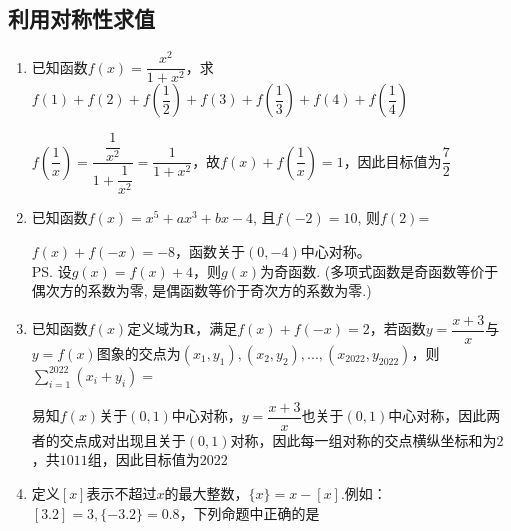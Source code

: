\subsection*{利用对称性求值}
\begin{enumerate}
    \item 已知函数$f(x) = \dfrac{x^2}{1+x^2}$，求$f(1)+f(2)+f\left(\dfrac{1}{2}\right) + f(3) + f\left(\dfrac{1}{3}\right) + f(4) + f\left(\dfrac{1}{4}\right)$
    \begin{jieda}
        $f\left(\dfrac{1}{x}\right) = \dfrac{\dfrac{1}{x^2}}{1+\dfrac{1}{x^2}} = \dfrac{1}{1+x^2}$，故$f(x) + f\left(\dfrac{1}{x}\right) = 1$，因此目标值为$\dfrac{7}{2}$
    \end{jieda}
    \item 已知函数$f(x)=x^5+ax^3+bx-4$, 且$f(-2)=10$, 则$f(2)$=
    \begin{jieda}
    $f(x)+f(-x)=-8$，函数关于$(0, -4)$中心对称。\\
    \ps 设$g(x) = f(x)+4$，则$g(x)$为奇函数. (多项式函数是奇函数等价于偶次方的系数为零, 是偶函数等价于奇次方的系数为零.)
    \end{jieda}
    
    \item 已知函数$f(x)$定义域为$\mathbf{R}$，满足$f(x) + f(-x) = 2$，若函数$y = \dfrac{x+3}{x}$与$y = f(x)$图象的交点为$(x_1, y_1), (x_2, y_2), ..., (x_{2022}, y_{2022})$，则$\sum_{i=1}^{2022}(x_i+y_i) = $
    \begin{jieda}
        易知$f(x)$关于$(0, 1)$中心对称，$y = \dfrac{x+3}{x}$也关于$(0, 1)$中心对称，因此两者的交点成对出现且关于$(0, 1)$对称，因此每一组对称的交点横纵坐标和为$2$，共$1011$组，因此目标值为$2022$
    \end{jieda}
    \item 定义$[x]$表示不超过$x$的最大整数，$\{x\} = x - [x]$.例如：$[3.2] = 3, \{-3.2\} = 0.8$，下列命题中正确的是
    \begin{jieda}
    \end{jieda}
    

\end{enumerate}
